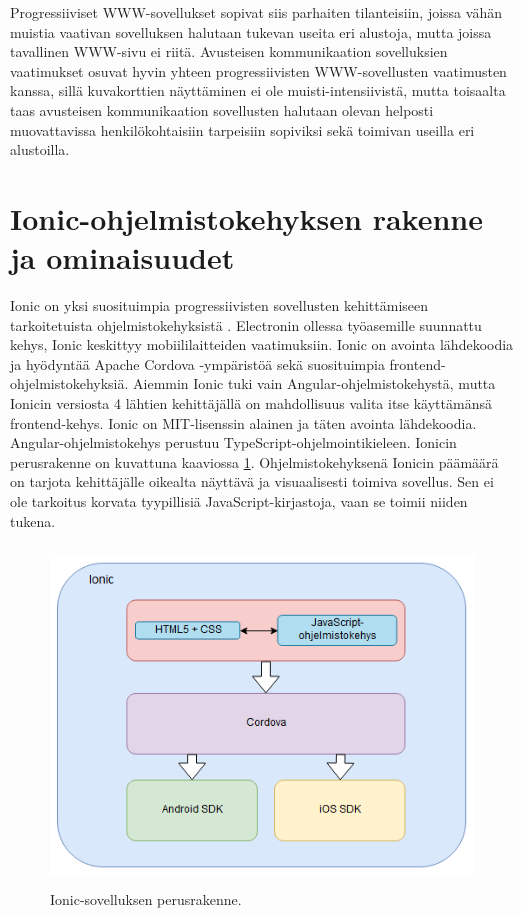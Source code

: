 \documentclass[utf8]{gradu3}
\begin{document}
Progressiiviset WWW-sovellukset sopivat siis parhaiten tilanteisiin, joissa vähän muistia vaativan sovelluksen halutaan tukevan useita eri alustoja, mutta joissa tavallinen WWW-sivu ei riitä. Avusteisen kommunikaation sovelluksien vaatimukset osuvat hyvin yhteen progressiivisten WWW-sovellusten vaatimusten kanssa, sillä kuvakorttien näyttäminen ei ole muisti-intensiivistä, mutta toisaalta taas avusteisen kommunikaation sovellusten halutaan olevan helposti muovattavissa henkilökohtaisiin tarpeisiin sopiviksi sekä toimivan useilla eri alustoilla.

\section{Ionic-ohjelmistokehyksen rakenne ja ominaisuudet}

Ionic on yksi suosituimpia progressiivisten sovellusten kehittämiseen tarkoitetuista ohjelmistokehyksistä \parencite[]{ionic-marketshare}. Electronin ollessa työasemille suunnattu kehys, Ionic keskittyy mobiililaitteiden vaatimuksiin. Ionic on avointa lähdekoodia ja hyödyntää Apache Cordova -ympäristöä sekä suosituimpia frontend-ohjelmistokehyksiä. Aiemmin Ionic tuki vain Angular-ohjelmistokehystä, mutta Ionicin versiosta 4 lähtien kehittäjällä on mahdollisuus valita itse käyttämänsä frontend-kehys. Ionic on MIT-lisenssin alainen ja täten avointa lähdekoodia. Angular-ohjelmistokehys perustuu TypeScript-ohjelmointikieleen. Ionicin perusrakenne on kuvattuna kaaviossa \ref{fig:ionic-structure}. Ohjelmistokehyksenä Ionicin päämäärä on tarjota kehittäjälle oikealta näyttävä ja visuaalisesti toimiva sovellus. Sen ei ole tarkoitus korvata tyypillisiä JavaScript-kirjastoja, vaan se toimii niiden tukena. \parencite[]{ionic-documentation}

\begin{figure}[h]\centering
  \includegraphics[height=9cm,keepaspectratio]{ionic-structure}
  \caption[Ionic-sovelluksen perusrakenne]
  {Ionic-sovelluksen perusrakenne.}
  \label{fig:ionic-structure}
\end{figure}
\end{document}
